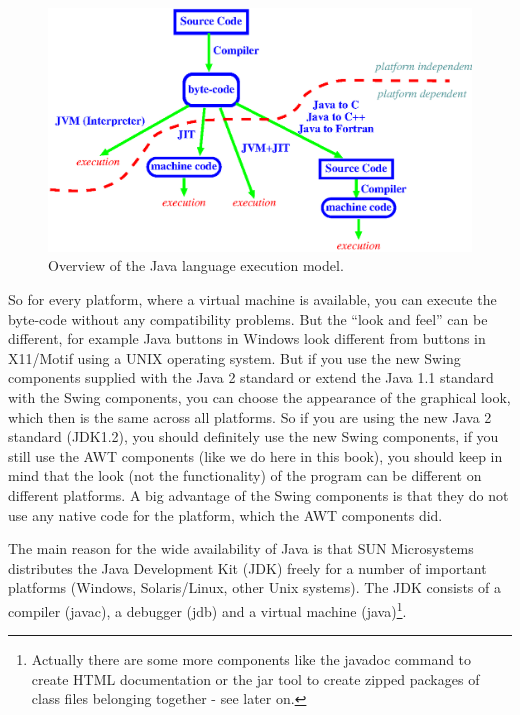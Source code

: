 \begin{figure}[htbp]
  \begin{center}
    \leavevmode
    \includegraphics{Figures/Java_Overview.eps}
    \caption{Overview of the Java language execution model.}
    \label{fig:Java_Overview}
  \end{center}
\end{figure}

So for every platform, where a virtual machine is available,
you can execute the byte-code without any compatibility problems.
But the ``look and feel'' can be different, for example Java buttons
in Windows look different from buttons in X11/Motif using a UNIX
operating system. But if you use the new Swing components supplied
with the Java 2 standard or extend the Java 1.1 standard with the Swing
components, you can choose the appearance of the graphical look, which then
is the same across all platforms. So if you are using the new Java 2 standard
(JDK1.2), you should definitely use the new Swing components, if you
still use the AWT components (like we do here in this book), you should
keep in mind that the look (not the functionality) 
of the program can be different on different platforms. 
A big advantage of the Swing components is that they do not use any
native code for the platform, which the AWT components did.

The main reason for the wide availability of Java
is that SUN Microsystems distributes the Java Development Kit (JDK)
freely for a number of important platforms (Windows, Solaris/Linux,
other Unix systems). The JDK consists of a compiler (javac), a
debugger (jdb) and a virtual machine (java)\footnote{Actually there
are some more components like the javadoc command to create HTML
documentation or the jar tool to create zipped packages of
class files belonging together - see later on.}.

